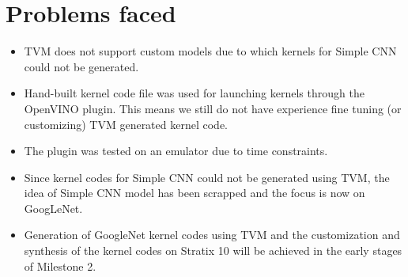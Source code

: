 \documentclass[titlepage]{report}
\begin{document}
\chapter{Problems faced}
\begin{itemize}
    
\item TVM does not support custom models due to which kernels for Simple CNN could not be generated.

\item Hand-built kernel code file was used for launching kernels through the OpenVINO plugin. This means we still do not have experience fine tuning (or customizing) TVM generated kernel code.

\item The plugin was tested on an emulator due to time constraints. 

\item Since kernel codes for Simple CNN could not be generated using TVM, the idea of Simple CNN model has been scrapped and the focus is now on GoogLeNet.

\item Generation of GoogleNet kernel codes using TVM and the customization and synthesis of the kernel codes on Stratix 10 will be achieved in the early stages of Milestone 2.

    

\end{itemize}
\end{document}
